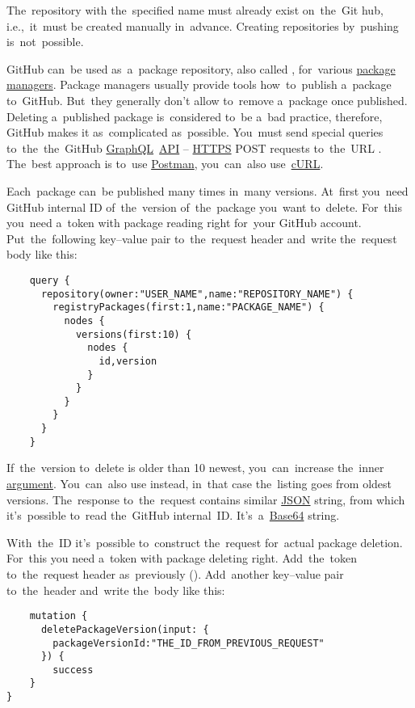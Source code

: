 \warning The~repository with the~specified name must already exist on~the~Git hub, i.e.,~it~must be created manually in~advance.
Creating repositories by~pushing is~not~possible.

\label{githubdeletepackage}
GitHub can~be used as~a~package repository, also called , for~various \hyperref[packagemanager]{package managers}.
Package managers usually provide tools how~to~publish a~package to~GitHub.
But~they generally don't allow to~remove a~package once published.
Deleting a~published package is~considered to~be a~bad practice, therefore, GitHub makes it as~complicated as~possible.
You~must send special queries to~the~the~GitHub \hyperref[graphql]{GraphQL}~\hyperref[api]{API} -- \hyperref[https]{HTTPS} POST requests to~the~URL .
The~best approach is to~use \href{https://www.getpostman.com/}{Postman}, you~can~also use~\hyperref[curl]{cURL}.

Each~package can~be published many times in~many versions.
At~first you~need GitHub internal ID of~the~version of~the~package you~want to~delete.
For~this you~need a~token with package reading right for~your GitHub account.
Put~the~following key--value pair  to~the~request header and~write the~request body like this:
\begin{lstlisting}
    query {
      repository(owner:"USER_NAME",name:"REPOSITORY_NAME") {
        registryPackages(first:1,name:"PACKAGE_NAME") {
          nodes {
            versions(first:10) {
              nodes {
                id,version
              }
            }
          }
        }
      }
    }
\end{lstlisting}

\noindent If~the~version to~delete is older than 10 newest, you~can~increase the~inner  \hyperref[parameterargument]{argument}.
You~can~also use  instead, in~that case the~listing goes from oldest versions.
The~response to~the~request contains similar \hyperref[json]{JSON} string, from which it's~possible to~read the~GitHub internal~ID\@.
It's~a~\hyperref[base64]{Base64} string.

With~the~ID it's~possible to~construct the~request for~actual package deletion.
For~this you need a~token with package deleting right.
Add~the~token to~the~request header as~previously ().
Add~another key--value pair  to~the~header and~write the~body like this:
\begin{lstlisting}
    mutation {
      deletePackageVersion(input: {
        packageVersionId:"THE_ID_FROM_PREVIOUS_REQUEST"
      }) {
        success
    }
}
\end{lstlisting}

